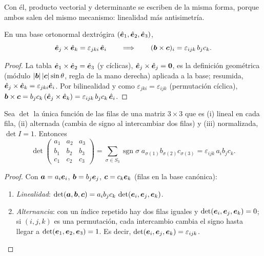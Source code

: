 Con él, producto vectorial y determinante se escriben de la misma forma,
porque ambos salen del mismo mecanismo: linealidad más antisimetría.

\begin{proposicion}
\label{prop:cruz}
En una base ortonormal dextrógira $(\hat{\bm{e}}_{1},\hat{\bm{e}}_{2},\hat{\bm{e}}_{3})$,
\begin{equation}
  \hat{\bm{e}}_{j}\times\hat{\bm{e}}_{k}=\varepsilon_{jki}\,\hat{\bm{e}}_{i}
  \qquad\Longrightarrow\qquad
  (\bm{b}\times\bm{c})_{i}=\varepsilon_{ijk}\,b_{j}c_{k}.
  \label{eq:cruz}
\end{equation}
\end{proposicion}

\begin{proof}
La tabla $\hat{\bm{e}}_{1}\times\hat{\bm{e}}_{2}=\hat{\bm{e}}_{3}$ (y cíclicas),
$\hat{\bm{e}}_{j}\times\hat{\bm{e}}_{j}=\bm{0}$, es la definición geométrica (módulo
$\left\lvert \bm{b}\right\rvert\left\lvert \bm{c}\right\rvert\sin\theta$, regla de la mano derecha) aplicada a la
base; resumida, $\hat{\bm{e}}_{j}\times\hat{\bm{e}}_{k}=\varepsilon_{jki}\hat{\bm{e}}_{i}$. Por
bilinealidad y como $\varepsilon_{jki}=\varepsilon_{ijk}$ (permutación cíclica),
$\bm{b}\times\bm{c}=b_{j}c_{k}\,(\hat{\bm{e}}_{j}\times\hat{\bm{e}}_{k})=\varepsilon_{ijk}\,b_{j}c_{k}\,\hat{\bm{e}}_{i}$.
\end{proof}

\begin{teorema}
\label{teo:leibniz}
Sea $\det$ la única función de las filas de una matriz $3\times3$ que es
(i) lineal en cada fila, (ii) alternada (cambia de signo al intercambiar dos
filas) y (iii) normalizada, $\det I=1$. Entonces
\begin{equation}
  \det\begin{pmatrix}a_{1}&a_{2}&a_{3}\\ b_{1}&b_{2}&b_{3}\\ c_{1}&c_{2}&c_{3}\end{pmatrix}
  =\sum_{\sigma\in S_{3}}\operatorname{sgn}\sigma\;a_{\sigma(1)}b_{\sigma(2)}c_{\sigma(3)}
  =\varepsilon_{ijk}\,a_{i}b_{j}c_{k}.
  \label{eq:leibniz}
\end{equation}
\end{teorema}

\begin{proof}
Con $\bm{a}=a_{i}\bm{e}_{i}$, $\bm{b}=b_{j}\bm{e}_{j}$, $\bm{c}=c_{k}\bm{e}_{k}$
(filas en la base canónica):
\begin{enumerate}
  \item \emph{Linealidad}: $\det(\bm{a},\bm{b},\bm{c})=a_{i}b_{j}c_{k}\,\det(\bm{e}_{i},\bm{e}_{j},\bm{e}_{k})$.
  \item \emph{Alternancia}: con un índice repetido hay dos filas iguales y
  $\det(\bm{e}_{i},\bm{e}_{j},\bm{e}_{k})=0$; si $(i,j,k)$ es una permutación,
  cada intercambio cambia el signo hasta llegar a $\det(\bm{e}_{1},\bm{e}_{2},\bm{e}_{3})=1$.
  Es decir, $\det(\bm{e}_{i},\bm{e}_{j},\bm{e}_{k})=\varepsilon_{ijk}$.\qedhere
\end{enumerate}
\end{proof}

